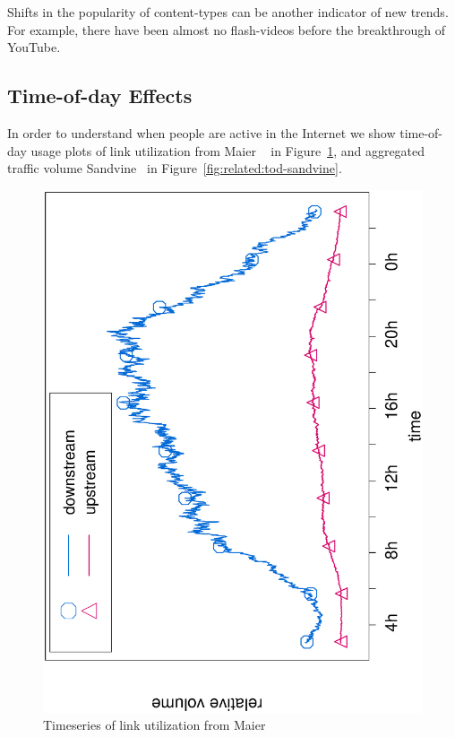 Shifts in the popularity of content-types can be another indicator of new
trends. For example, there have been almost no flash-videos before the
breakthrough of YouTube.



\subsection{Time-of-day Effects}\label{sec:related:tod}

In order to understand when people are active in the Internet we show
time-of-day usage plots of link utilization from Maier
\etal~\cite{OnDominantCharacteristics2009} in
Figure~\ref{fig:related:tod-maier}, and aggregated traffic volume
Sandvine~\cite{sandvine} in Figure~\ref{fig:related:tod-sandvine}.

\begin{figure}[tbp]
\centering
\includegraphics[angle=-90,width=0.85\linewidth]{figures/maier-tod.eps}
\renewcommand{\capname}{Timeseries of link utilization from Maier \etal}
\caption[\capname]{\capname~\cite{OnDominantCharacteristics2009}}
\label{fig:related:tod-maier}
\end{figure}


